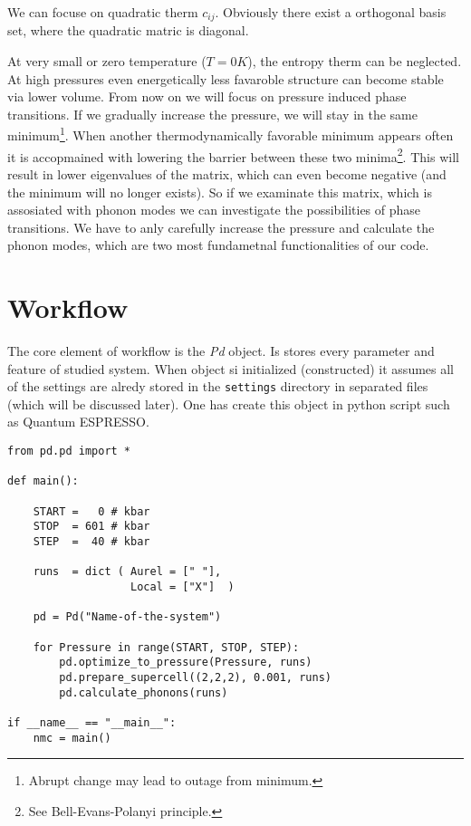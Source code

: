 \documentclass[12pt]{article}
\begin{document}
We can focuse on quadratic therm $c_{ij}$. Obviously there exist a orthogonal basis set, where the quadratic matric is diagonal. 

At very small or zero temperature ($T = 0K$), the entropy therm can be neglected. At high pressures even energetically less favaroble structure can become stable via lower volume. From now on we will focus on pressure induced phase transitions. If we gradually increase the pressure, we will stay in the same minimum\footnote{Abrupt change may lead to outage from minimum.}. When another thermodynamically favorable minimum appears often it is accopmained with lowering the barrier between these two minima\footnote{See Bell-Evans-Polanyi principle.}. This will result in lower eigenvalues of the matrix, which can even become negative (and the minimum will no longer exists). So if we examinate this matrix, which is assosiated with phonon modes we can investigate the possibilities of phase transitions. We have to anly carefully increase the pressure and calculate the phonon modes, which are two most fundametnal functionalities of our code.


\section{Workflow}

The core element of \pe workflow is the \textit{Pd} object. Is stores every parameter and feature of studied system. When object si initialized (constructed) it assumes all of the settings are alredy stored in the \texttt{settings} directory in separated files (which will be discussed later). One has create this object in python script such as Quantum ESPRESSO\cite{QE}.

\begin{verbatim}
from pd.pd import *

def main():

    START =   0 # kbar
    STOP  = 601 # kbar
    STEP  =  40 # kbar

    runs  = dict ( Aurel = [" "],
                   Local = ["X"]  )

    pd = Pd("Name-of-the-system")

    for Pressure in range(START, STOP, STEP):
        pd.optimize_to_pressure(Pressure, runs)
        pd.prepare_supercell((2,2,2), 0.001, runs)
        pd.calculate_phonons(runs)

if __name__ == "__main__":
    nmc = main()
\end{verbatim}
\end{document}
